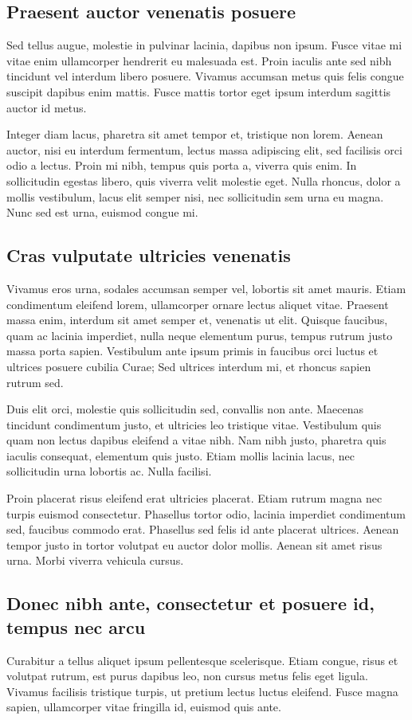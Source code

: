 \subsection{Praesent auctor venenatis posuere}
Sed tellus augue, molestie in pulvinar lacinia, dapibus non ipsum. Fusce
vitae mi vitae enim ullamcorper hendrerit eu malesuada est. Proin iaculis
ante sed nibh tincidunt vel interdum libero posuere. Vivamus accumsan metus
quis felis congue suscipit dapibus enim mattis. Fusce mattis tortor eget
ipsum interdum sagittis auctor id metus.

Integer diam lacus, pharetra sit amet tempor et, tristique non lorem.
Aenean auctor, nisi eu interdum fermentum, lectus massa adipiscing elit,
sed facilisis orci odio a lectus. Proin mi nibh, tempus quis porta a,
viverra quis enim. In sollicitudin egestas libero, quis viverra velit
molestie eget. Nulla rhoncus, dolor a mollis vestibulum, lacus elit semper
nisi, nec sollicitudin sem urna eu magna. Nunc sed est urna, euismod congue
mi.

\subsection{Cras vulputate ultricies venenatis}
Vivamus eros urna, sodales accumsan semper vel, lobortis sit amet mauris.
Etiam condimentum eleifend lorem, ullamcorper ornare lectus aliquet vitae.
Praesent massa enim, interdum sit amet semper et, venenatis ut elit.
Quisque faucibus, quam ac lacinia imperdiet, nulla neque elementum purus,
tempus rutrum justo massa porta sapien. Vestibulum ante ipsum primis in
faucibus orci luctus et ultrices posuere cubilia Curae; Sed ultrices
interdum mi, et rhoncus sapien rutrum sed.

Duis elit orci, molestie quis sollicitudin sed, convallis non ante.
Maecenas tincidunt condimentum justo, et ultricies leo tristique vitae.
Vestibulum quis quam non lectus dapibus eleifend a vitae nibh. Nam nibh
justo, pharetra quis iaculis consequat, elementum quis justo. Etiam mollis
lacinia lacus, nec sollicitudin urna lobortis ac. Nulla facilisi.

Proin placerat risus eleifend erat ultricies placerat. Etiam rutrum magna
nec turpis euismod consectetur. Phasellus tortor odio, lacinia imperdiet
condimentum sed, faucibus commodo erat. Phasellus sed felis id ante
placerat ultrices. Aenean tempor justo in tortor volutpat eu auctor dolor
mollis. Aenean sit amet risus urna. Morbi viverra vehicula cursus.

\subsection{Donec nibh ante, consectetur et posuere id, tempus nec arcu}
Curabitur a tellus aliquet ipsum pellentesque scelerisque. Etiam congue,
risus et volutpat rutrum, est purus dapibus leo, non cursus metus felis
eget ligula. Vivamus facilisis tristique turpis, ut pretium lectus luctus
eleifend. Fusce magna sapien, ullamcorper vitae fringilla id, euismod quis
ante.

